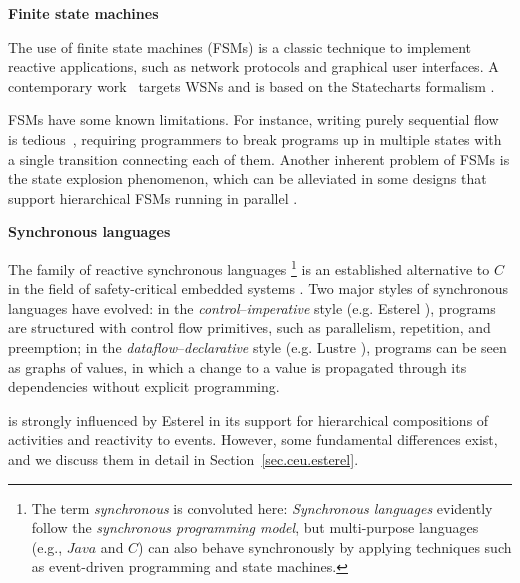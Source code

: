 \textbf{Finite state machines}

The use of finite state machines (FSMs) is a classic technique to implement
reactive applications, such as network protocols and graphical user interfaces.
A contemporary work~\cite{wsn.osm} targets WSNs and is based on the Statecharts 
formalism \cite{statecharts.visual}.

FSMs have some known limitations.
For instance, writing purely sequential flow is tedious~\cite{wsn.osm}, 
requiring programmers to break programs up in multiple states with a single 
transition connecting each of them.  Another inherent problem of FSMs is the 
state explosion phenomenon, which can be alleviated in some designs that 
support hierarchical FSMs running in parallel \cite{wsn.osm}.



\textbf{Synchronous languages}

The family of reactive synchronous languages%
\footnote{
The term \emph{synchronous} is convoluted here:
\emph{Synchronous languages} evidently follow the \emph{synchronous programming 
model}, but multi-purpose languages (e.g., $Java$ and $C$) can also behave 
synchronously by applying techniques such as event-driven programming and state 
machines.
}
is an established alternative to $C$ in the field of safety-critical embedded 
systems \cite{rp.twelve}.
%
Two major styles of synchronous languages have evolved:
in the \emph{control}--\emph{imperative} style (e.g. Esterel 
\cite{esterel.ieee91}), programs are structured with control flow primitives, 
such as parallelism, repetition, and preemption;
in the \emph{dataflow}--\emph{declarative} style (e.g. Lustre 
\cite{lustre.ieee91}), programs can be seen as graphs of values, in which a 
change to a value is propagated through its dependencies without explicit 
programming.

\CEU is strongly influenced by Esterel in its support for hierarchical 
compositions of activities and reactivity to events.
%
However, some fundamental differences exist, and we discuss them in detail in
Section~\ref{sec.ceu.esterel}.

